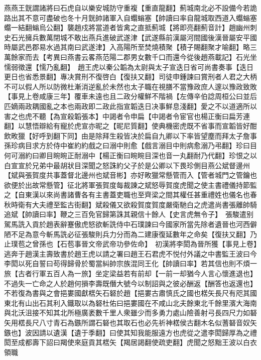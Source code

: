 燕燕王皝謂諸將曰石虎自以樂安城防守重複【重直龍翻】薊城南北必不設備今若詭路出其不意可盡破也冬十月皝帥諸軍入自蠮螉塞【帥讀曰率自龍城取西道入蠮螉塞蠮一結翻螉烏公翻】襲趙戍將當道者皆禽之直抵薊城【將即亮翻薊音計】趙幽州刺史石光擁兵數萬閉城不敢出燕兵進破武遂津【武遂縣前漢屬河間國後漢晉屬安平國時屬武邑郡易水過其南曰武遂津】入高陽所至焚燒積聚【積子賜翻聚才喻翻】略三萬餘家而去【考異曰燕書云畧燕范陽二郡男女數千口而還今從後趙燕載記】石光坐懦弱徵還【懦乃亂翻】　趙王虎以秦公韜為太尉與太子宣迭日省可尚書奏事【迭日更日也省悉景翻】專决賞刑不復啓白【復扶又翻】司徒申鍾諫曰賞刑者人君之大柄不可以假人所以防微杜漸消逆亂於未然也太子職在視膳不當豫政庶人邃以豫政致敗【事見上卷咸康三年】覆車未遠也且二政分權鮮不階禍【左傳辛伯諗周桓公曰並后匹嫡兩政耦國亂之本也兩政即二政此指宣韜迭日决事鮮息淺翻】愛之不以道適所以害之也虎不聽【為宣殺韜張本】中謁者令申扁【中謁者令宦官也楊正衡曰扁芳連翻】以慧悟辯給有寵於虎宣亦昵之【昵尼質翻】使典機密虎既不省事而宣韜皆好酣飲畋獵【好呼到翻下同】由是除拜生殺皆决於扁自九卿以下率皆望塵而拜太子詹事孫珍病目求方於侍中崔約約戲之曰溺中則愈【戲言溺目中則病愈溺乃弔翻】珍曰目何可溺約曰卿目睕睕正耐溺中【楊正衡曰睕睕目深也音一丸翻耐乃代翻】珍恨之以白宣宣於兄弟中最胡狀目深聞之怒誅約父子於是公卿以下畏珍側目燕公斌督邊州【斌與張賀度共事蓋督北邊州也斌音彬】亦好畋獵常懸管而入【管者城門之管鑰也欲便於出故常懸管】征北將軍張賀度每裁諫之斌怒辱賀度虎聞之使主書禮儀持節監之【自東漢以來尚書諸曹各有主書蓋吏職也至齊梁之間其權任甚重禮姓也儀名也春秋時衛有大夫禮至監古街翻】斌殺儀又欲殺賀度賀度嚴衛馳白之虎遣尚書張離帥騎追斌【帥讀曰率】鞭之三百免官歸第誅其親信十餘人【史言虎無令子】　張駿遣别駕馬詵入貢於趙表辭蹇傲虎怒欲斬詵侍中石璞諫曰今國家所當先除者遺晉也河西僻陋不足為意今斬馬詵必征張駿則兵力分而為二建康復延數年之命矣【復扶又翻】乃止璞苞之曾孫也【石苞事晉文帝武帝功參佐命】　初漢將李閎為晉所獲【事見上卷】逃奔于趙漢主壽致書於趙王虎以請之署曰趙王石君虎不悦付外議之中書監王波曰今李閎以死自誓曰苟得歸骨於蜀當糾帥宗族混同王化【帥讀曰率】若其信也則不煩一旅【古者行軍五百人為一旅】坐定梁益若有前却【一前一却猶今人言心懷進退也】不過失一亡命之人於趙何損李壽既僭大號今以制詔與之彼必酬返【酬答也返還也】不若復為書與之會挹婁國獻楛矢石砮於趙【挹婁古肅慎氏之國也楛矢長尺有咫其國東北有山出石其利入鐵取以為砮杜佑曰挹婁國在不咸山北夫餘東北千餘里濱大海南與北沃沮接不知其北所極廣袤數千里人衆雖少而多勇力處山險善射弓長四尺力如砮矢用楛長尺八寸青石為鏃所謂石砮也其取石也必先祈神楛侯古翻木名似蓍砮音奴矢鏃也】波因請以遺漢【遺于季翻】曰使其知我能服遠方也虎從之遣李閎歸厚為之禮閎至成都壽下詔曰羯使來庭貢其楛矢【羯居謁翻使疏吏翻】虎聞之怒黜王波以白衣領職

